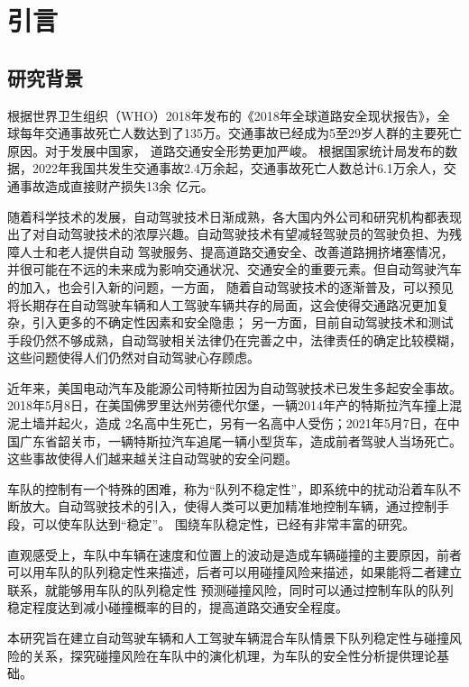 
\chapter{引言}

\section{研究背景}

根据世界卫生组织（WHO）2018年发布的《2018年全球道路安全现状报告》，全球每年交通事故死亡人数达到了135万。交通事故已经成为5至29岁人群的主要死亡原因。对于发展中国家，
道路交通安全形势更加严峻。\cite{WHO} 根据国家统计局发布的数据，2022年我国共发生交通事故2.4万余起，交通事故死亡人数总计6.1万余人，交通事故造成直接财产损失13余
亿元。\cite{stats_gov}

随着科学技术的发展，自动驾驶技术日渐成熟，各大国内外公司和研究机构都表现出了对自动驾驶技术的浓厚兴趣。自动驾驶技术有望减轻驾驶员的驾驶负担、为残障人士和老人提供自动
驾驶服务、提高道路交通安全、改善道路拥挤堵塞情况，并很可能在不远的未来成为影响交通状况、交通安全的重要元素。但自动驾驶汽车的加入，也会引入新的问题，一方面，
随着自动驾驶技术的逐渐普及，可以预见将长期存在自动驾驶车辆和人工驾驶车辆共存的局面，这会使得交通路况更加复杂，引入更多的不确定性因素和安全隐患；
另一方面，目前自动驾驶技术和测试手段仍然不够成熟，自动驾驶相关法律仍在完善之中，法律责任的确定比较模糊，这些问题使得人们仍然对自动驾驶心存顾虑。

近年来，美国电动汽车及能源公司特斯拉因为自动驾驶技术已发生多起安全事故。2018年5月8日，在美国佛罗里达州劳德代尔堡，一辆2014年产的特斯拉汽车撞上混泥土墙并起火，造成
2名高中生死亡，另有一名高中人受伤；2021年5月7日，在中国广东省韶关市，一辆特斯拉汽车追尾一辆小型货车，造成前者驾驶人当场死亡。这些事故使得人们越来越关注自动驾驶的安全问题。

车队的控制有一个特殊的困难，称为“队列不稳定性”，即系统中的扰动沿着车队不断放大。自动驾驶技术的引入，使得人类可以更加精准地控制车辆，通过控制手段，可以使车队达到“稳定”。
围绕车队稳定性，已经有非常丰富的研究。

直观感受上，车队中车辆在速度和位置上的波动是造成车辆碰撞的主要原因，前者可以用车队的队列稳定性来描述，后者可以用碰撞风险来描述，如果能将二者建立联系，就能够用车队的队列稳定性
预测碰撞风险，同时可以通过控制车队的队列稳定程度达到减小碰撞概率的目的，提高道路交通安全程度。

本研究旨在建立自动驾驶车辆和人工驾驶车辆混合车队情景下队列稳定性与碰撞风险的关系，探究碰撞风险在车队中的演化机理，为车队的安全性分析提供理论基础。





